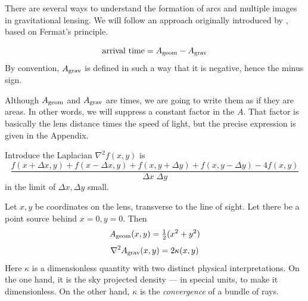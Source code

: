 There are several ways to understand the formation of arcs and
multiple images in gravitational lensing.  We will follow an approach
originally introduced by \cite{1986ApJ...310..568B}, based on Fermat's
principle.

\begin{equation}
\hbox{arrival time} = A_{\rm geom} - A_{\rm grav}
\end{equation}
By convention, $A_{\rm grav}$ is defined in such a way that it is
negative, hence the minus sign.

Although $A_{\rm geom}$ and $A_{\rm grav}$ are times, we are going to
write them as if they are areas.  In other words, we will suppress a
constant factor in the $A$.  That factor is basically the lens
distance times the speed of light, but the precise expression is given
in the Appendix.

Introduce the Laplacian $\nabla^2 f(x,y)$ is
\begin{equation}
 \frac{ f(x+\Delta x, y) + f(x-\Delta x, y) +
        f(x, y+\Delta y) + f(x, y-\Delta y) - 4 f(x,y) }
      {\Delta x \; \Delta y}
\end{equation}
in the limit of $\Delta x,\Delta y$ small.

Let $x,y$ be coordinates on the lens, transverse to the line of sight.
Let there be a point source behind $x=0,y=0$.  Then
\begin{equation}
A_{\rm geom}(x,y) = {\textstyle\frac12}(x^2 + y^2)
\end{equation}
\begin{equation}
\nabla^2 A_{\rm grav}(x,y) = 2\kappa(x,y)
\end{equation}
Here $\kappa$ is a dimensionless quantity with two distinct physical
interpretations.  On the one hand, it is the sky projected density ---
in special units, to make it dimensionless.  On the other hand,
$\kappa$ is the {\em convergence\/} of a bundle of rays.
